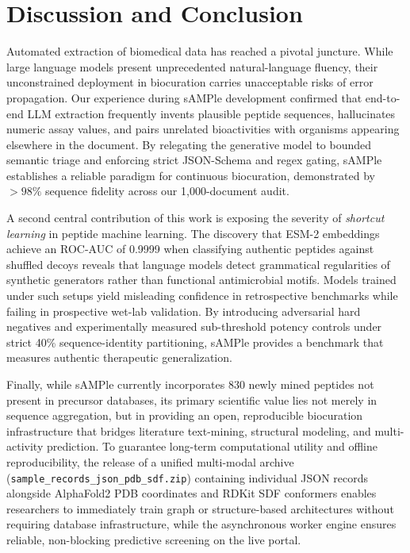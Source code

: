 \documentclass[unnumsec,webpdf,contemporary,large]{oup-authoring-template}%
\begin{document}
\section{Discussion and Conclusion}

Automated extraction of biomedical data has reached a pivotal juncture. While large language models present unprecedented natural-language fluency, their unconstrained deployment in biocuration carries unacceptable risks of error propagation. Our experience during sAMPle development confirmed that end-to-end LLM extraction frequently invents plausible peptide sequences, hallucinates numeric assay values, and pairs unrelated bioactivities with organisms appearing elsewhere in the document. By relegating the generative model to bounded semantic triage and enforcing strict JSON-Schema and regex gating, sAMPle establishes a reliable paradigm for continuous biocuration, demonstrated by $>98\%$ sequence fidelity across our 1,000-document audit.

A second central contribution of this work is exposing the severity of \emph{shortcut learning} in peptide machine learning. The discovery that ESM-2 embeddings achieve an ROC-AUC of 0.9999 when classifying authentic peptides against shuffled decoys reveals that language models detect grammatical regularities of synthetic generators rather than functional antimicrobial motifs. Models trained under such setups yield misleading confidence in retrospective benchmarks while failing in prospective wet-lab validation. By introducing adversarial hard negatives and experimentally measured sub-threshold potency controls under strict 40\% sequence-identity partitioning, sAMPle provides a benchmark that measures authentic therapeutic generalization.

Finally, while sAMPle currently incorporates 830 newly mined peptides not present in precursor databases, its primary scientific value lies not merely in sequence aggregation, but in providing an open, reproducible biocuration infrastructure that bridges literature text-mining, structural modeling, and multi-activity prediction. To guarantee long-term computational utility and offline reproducibility, the release of a unified multi-modal archive (\texttt{sample\_records\_json\_pdb\_sdf.zip}) containing individual JSON records alongside AlphaFold2 PDB coordinates and RDKit SDF conformers enables researchers to immediately train graph or structure-based architectures without requiring database infrastructure, while the asynchronous worker engine ensures reliable, non-blocking predictive screening on the live portal.
\end{document}
